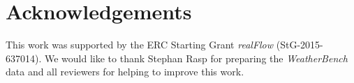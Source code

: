\documentclass{article}
\begin{document}
\section*{Acknowledgements}
This work was supported by the ERC Starting Grant \textit{realFlow} (StG-2015-637014). We would like to thank Stephan Rasp for preparing the \textit{WeatherBench} data and all reviewers for helping to improve this work.


{
\small


}

\newpage

\appendix

\end{document}
